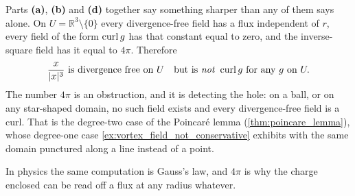 \begin{exercisesolution}
\begin{remark}
Parts \textbf{(a)}, \textbf{(b)} and \textbf{(d)} together say something sharper than any of them
says alone. On $U = \mathbb{R}^3\setminus\{0\}$ every divergence-free field has a flux
independent of $r$, every field of the form $\operatorname{curl} g$ has that constant equal to zero, and the
inverse-square field has it equal to $4\pi$. Therefore
\[\frac{x}{\lvert x\rvert^3} \text{ is divergence free on } U
  \quad\text{but is \emph{not} } \operatorname{curl} g \text{ for any } g \text{ on } U .\]
The number $4\pi$ is an obstruction, and it is detecting the hole: on a ball, or on any
star-shaped domain, no such field exists and every divergence-free field is a curl. That is the
degree-two case of the Poincar\'e lemma (\cref{thm:poincare_lemma}), whose degree-one case
\cref{ex:vortex_field_not_conservative} exhibits with the same domain punctured along a line
instead of a point.

In physics the same computation is Gauss's law, and $4\pi$ is why the charge enclosed can be read
off a flux at any radius whatever.
\end{remark}
\end{exercisesolution}



